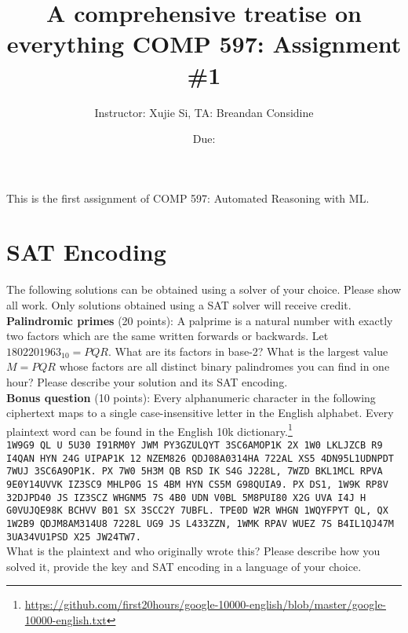 \documentclass[11pt]{article}
\author{Instructor: Xujie Si, TA: Breandan Considine}
\date{Due: }
\title{A comprehensive treatise on everything\vspace{-2ex}%
}
\title{COMP 597: Assignment \#1}
\begin{document}
    \maketitle
    \noindent This is the first assignment of COMP 597: Automated Reasoning with ML.


    \section{SAT Encoding}

    The following solutions can be obtained using a solver of your choice. Please show all work. Only solutions obtained using a SAT solver will receive credit.\\

    \noindent \textbf{Palindromic primes} (20 points): A palprime is a natural number with exactly two factors which are the same written forwards or backwards. Let $1802201963_{10} = PQR$. What are its factors in base-2? What is the largest value $M=PQR$ whose factors are all distinct binary palindromes you can find in one hour? Please describe your solution and its SAT encoding.\\

    \noindent \textbf{Bonus question} (10 points): Every alphanumeric character in the following ciphertext maps to a single case-insensitive letter in the English alphabet. Every plaintext word can be found in the English 10k dictionary.\footnote{\url{https://github.com/first20hours/google-10000-english/blob/master/google-10000-english.txt}}\\

    \noindent \tiny\texttt{1W9G9 QL U 5U30 I91RM0Y JWM PY3GZULQYT 3SC6AMOP1K 2X 1W0 LKLJZCB R9 I4QAN HYN 24G UIPAP1K 12 NZEM826 QDJ08A0314HA 722AL XS5 4DN95L1UDNPDT 7WUJ 3SC6A9OP1K. PX 7W0 5H3M QB RSD IK S4G J228L, 7WZD BKL1MCL RPVA 9E0Y14UVVK IZ3SC9 MHLP0G 1S 4BM HYN CS5M G98QUIA9. PX DS1, 1W9K RP8V 32DJPD40 JS IZ3SCZ WHGNM5 7S 4B0 UDN V0BL 5M8PUI80 X2G UVA I4J H G0VUJQE98K BCHVV B01 SX 3SCC2Y 7UBFL. TPE0D W2R WHGN 1WQYFPYT QL, QX 1W2B9 QDJM8AM314U8 7228L UG9 JS L433ZZN, 1WMK RPAV WUEZ 7S B4IL1QJ47M 3UA34VU1PSD X25 JW24TW7.}\normalsize\\

    \noindent What is the plaintext and who originally wrote this? Please describe how you solved it, provide the key and SAT encoding in a language of your choice.

    \pagebreak
\end{document}
